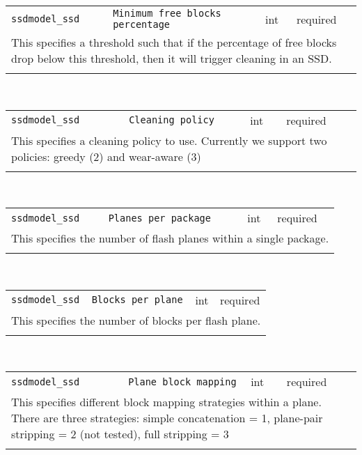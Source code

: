 \noindent 
\begin{tabular}{|p{\lpmodwidth}|p{\lpnamewidth}|p{0.5in}|p{0.5in}|}
\cline{1-4}
\texttt{ssdmodel\_ssd} & \texttt{Minimum free blocks percentage} & int & required \\ 
\cline{1-4}
\multicolumn{4}{|p{6in}|}{
This specifies a threshold such that if the percentage of free blocks
drop below this threshold, then it will trigger cleaning in an SSD.
}\\ 
\cline{1-4}
\multicolumn{4}{p{5in}}{}\\
\end{tabular}\\ 
\noindent 
\begin{tabular}{|p{\lpmodwidth}|p{\lpnamewidth}|p{0.5in}|p{0.5in}|}
\cline{1-4}
\texttt{ssdmodel\_ssd} & \texttt{Cleaning policy} & int & required \\ 
\cline{1-4}
\multicolumn{4}{|p{6in}|}{
This specifies a cleaning policy to use. Currently we support
two policies: greedy (2) and wear-aware (3)
}\\ 
\cline{1-4}
\multicolumn{4}{p{5in}}{}\\
\end{tabular}\\ 
\noindent 
\begin{tabular}{|p{\lpmodwidth}|p{\lpnamewidth}|p{0.5in}|p{0.5in}|}
\cline{1-4}
\texttt{ssdmodel\_ssd} & \texttt{Planes per package} & int & required \\ 
\cline{1-4}
\multicolumn{4}{|p{6in}|}{
This specifies the number of flash planes within a single package.
}\\ 
\cline{1-4}
\multicolumn{4}{p{5in}}{}\\
\end{tabular}\\ 
\noindent 
\begin{tabular}{|p{\lpmodwidth}|p{\lpnamewidth}|p{0.5in}|p{0.5in}|}
\cline{1-4}
\texttt{ssdmodel\_ssd} & \texttt{Blocks per plane} & int & required \\ 
\cline{1-4}
\multicolumn{4}{|p{6in}|}{
This specifies the number of blocks per flash plane.
}\\ 
\cline{1-4}
\multicolumn{4}{p{5in}}{}\\
\end{tabular}\\ 
\noindent 
\begin{tabular}{|p{\lpmodwidth}|p{\lpnamewidth}|p{0.5in}|p{0.5in}|}
\cline{1-4}
\texttt{ssdmodel\_ssd} & \texttt{Plane block mapping} & int & required \\ 
\cline{1-4}
\multicolumn{4}{|p{6in}|}{
This specifies different block mapping strategies within a plane.
There are three strategies: simple concatenation = 1,
plane-pair stripping = 2 (not tested), full stripping = 3
}\\ 
\cline{1-4}
\multicolumn{4}{p{5in}}{}\\
\end{tabular}\\ 
